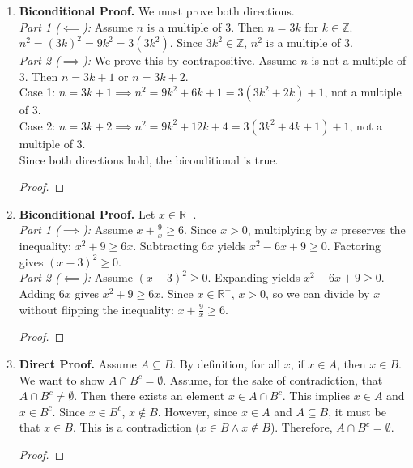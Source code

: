 \documentclass[11pt]{article}
\renewcommand{\qedsymbol}{$\blacksquare$}
\begin{document}
\begin{enumerate}
    \item \textbf{Biconditional Proof.} We must prove both directions. \\
    \textit{Part 1 ($\impliedby$):} Assume $n$ is a multiple of 3. Then $n = 3k$ for $k \in \mathbb{Z}$. $n^2 = (3k)^2 = 9k^2 = 3(3k^2)$. Since $3k^2 \in \mathbb{Z}$, $n^2$ is a multiple of 3. \\
    \textit{Part 2 ($\implies$):} We prove this by contrapositive. Assume $n$ is not a multiple of 3. Then $n = 3k + 1$ or $n = 3k + 2$. \\
    Case 1: $n = 3k + 1 \implies n^2 = 9k^2 + 6k + 1 = 3(3k^2 + 2k) + 1$, not a multiple of 3. \\
    Case 2: $n = 3k + 2 \implies n^2 = 9k^2 + 12k + 4 = 3(3k^2 + 4k + 1) + 1$, not a multiple of 3. \\
    Since both directions hold, the biconditional is true.
    \begin{proof}\renewcommand{\qedsymbol}{$\blacksquare$}\end{proof}

    \item \textbf{Biconditional Proof.} Let $x \in \mathbb{R}^+$. \\
    \textit{Part 1 ($\implies$):} Assume $x + \frac{9}{x} \ge 6$. Since $x > 0$, multiplying by $x$ preserves the inequality: $x^2 + 9 \ge 6x$. Subtracting $6x$ yields $x^2 - 6x + 9 \ge 0$. Factoring gives $(x-3)^2 \ge 0$. \\
    \textit{Part 2 ($\impliedby$):} Assume $(x-3)^2 \ge 0$. Expanding yields $x^2 - 6x + 9 \ge 0$. Adding $6x$ gives $x^2 + 9 \ge 6x$. Since $x \in \mathbb{R}^+$, $x > 0$, so we can divide by $x$ without flipping the inequality: $x + \frac{9}{x} \ge 6$.
    \begin{proof}\renewcommand{\qedsymbol}{$\blacksquare$}\end{proof}

    \item \textbf{Direct Proof.} Assume $A \subseteq B$. By definition, for all $x$, if $x \in A$, then $x \in B$. We want to show $A \cap B^c = \emptyset$. Assume, for the sake of contradiction, that $A \cap B^c \neq \emptyset$. Then there exists an element $x \in A \cap B^c$. This implies $x \in A$ and $x \in B^c$. Since $x \in B^c$, $x \notin B$. However, since $x \in A$ and $A \subseteq B$, it must be that $x \in B$. This is a contradiction ($x \in B \land x \notin B$). Therefore, $A \cap B^c = \emptyset$.
    \begin{proof}\renewcommand{\qedsymbol}{$\blacksquare$}\end{proof}


\end{enumerate}
\end{document}

